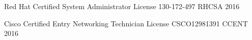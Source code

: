 

\begin{cvhonors}


    \cvhonor
    {Red Hat Certified System Administrator}
    {License 130-172-497}
    {RHCSA}
    {2016}

  \cvhonor
    {Cisco Certified Entry Networking Technician}
    {License CSCO12981391}
    {CCENT}
    {2016}

\end{cvhonors}

